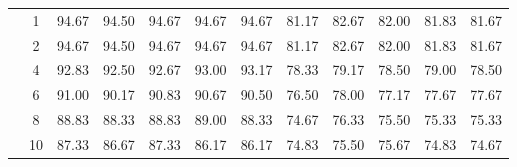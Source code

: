 \begin{table}[H]
\begin{tabular}{|c|c|c c c c c|c c c c c|}
\multicolumn{1}{|c|}{ \multirow{6}{*}{\rotatebox[origin=c]{90}{\textbf{K-vizinhos}}} }
&1	&94.67	&94.50	&94.67	&94.67	&94.67	&81.17	&82.67	&82.00	&81.83	&81.67\\\cline{2-12}
&2	&94.67	&94.50	&94.67	&94.67	&94.67	&81.17	&82.67	&82.00	&81.83	&81.67\\\cline{2-12}
&4	&92.83	&92.50	&92.67	&93.00	&93.17	&78.33	&79.17	&78.50	&79.00	&78.50\\\cline{2-12}
&6	&91.00	&90.17	&90.83	&90.67	&90.50	&76.50	&78.00	&77.17	&77.67	&77.67\\\cline{2-12}
&8	&88.83	&88.33	&88.83	&89.00	&88.33	&74.67	&76.33	&75.50	&75.33	&75.33\\\cline{2-12}
&10	&87.33	&86.67	&87.33	&86.17	&86.17	&74.83	&75.50	&75.67	&74.83	&74.67%


\\\midrule
	\end{tabular}
\end{table}






